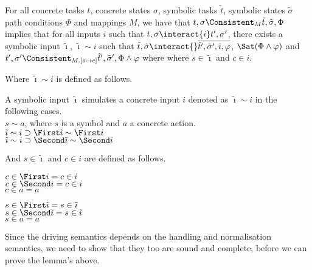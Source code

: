 \begin{lemma}
  \label{lem:completedriving}
  For all concrete tasks $t$, concrete states $\sigma$, symbolic tasks $\tilde{t}$, symbolic states $\tilde{\sigma}$ path conditions $\Phi$ and mappings $M$,
  we have that $t,\sigma\Consistent_{M}\tilde{t},\tilde{\sigma},\Phi$ implies
  that for all inputs $i$ such that $t,\sigma\interact{i}t',\sigma'$,
  there exists a symbolic input $\tilde{\imath}$, $\tilde{\imath}\sim i$ such that
  $\tilde{t},\tilde{\sigma}\interact{}\overline{\tilde{t}',\tilde{\sigma}',\tilde{\imath},\phi}$, $\Sat(\Phi\land\phi)$ and $t',\sigma'\Consistent_{M.[s\mapsto c]}\tilde{t}',\tilde{\sigma}',\Phi\land\phi$ where where $s\in\tilde{\imath}$ and $c\in i$.
\end{lemma}

Where $\tilde{\imath}\sim i$ is defined as follows.

\begin{definition}
  A symbolic input $\tilde{\imath}$ simulates a concrete input $i$ denoted as $\tilde{\imath}\sim i$ in the following cases.\\
  $s\sim a$, where $s$ is a symbol and $a$ a concrete action.\\
  $\tilde{\imath}\sim i\implies \First \tilde{\imath} \sim \First i$\\
  $\tilde{\imath}\sim i\implies \Second \tilde{\imath} \sim \Second i$
\end{definition}

And $s\in \tilde{\imath}$ and $c\in i$ are defined as follows.

\begin{definition}
  $c\in \First i = c\in i $\\
  $c\in \Second i = c\in i $\\
  $c\in a = a $
\end{definition}

\begin{definition}
  $s\in \First \tilde{\imath} = s\in \tilde{\imath} $\\
  $s\in \Second \tilde{\imath} = s\in \tilde{\imath} $\\
  $s\in a = a $
\end{definition}

Since the driving semantics depends on the handling and normalisation semantics, we need to show that they too are sound and complete, before we can prove the lemma's above.


